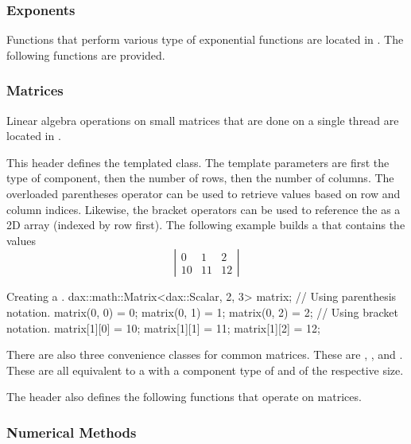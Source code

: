 \subsubsection{Exponents}

Functions that perform various type of exponential functions are located in
. The following functions are provided.

\subsubsection{Matrices}

Linear algebra operations on small matrices that are done on a single
thread are located in .

This header defines the  templated class. The template
parameters are first the type of component, then the number of rows, then
the number of columns. The overloaded parentheses operator can be used to
retrieve values based on row and column indices. Likewise, the bracket
operators can be used to reference the  as a 2D
array (indexed by row first). The following example builds a
 that contains the values
\begin{equation*}
  \left|
  \begin{array}{ccc}
    0 & 1 & 2 \\
    10 & 11 & 12
  \end{array}
  \right|
\end{equation*}

\begin{daxexample}{Creating a .}
dax::math::Matrix<dax::Scalar, 2, 3> matrix;
// Using parenthesis notation.
matrix(0, 0) = 0;
matrix(0, 1) = 1;
matrix(0, 2) = 2;
// Using bracket notation.
matrix[1][0] = 10;
matrix[1][1] = 11;
matrix[1][2] = 12;
\end{daxexample}

There are also three convenience classes for common matrices. These are
, , and . These
are all equivalent to a  with a component type of
 and of the respective size.

The  header also defines the following
functions that operate on matrices.

\subsubsection{Numerical Methods}

